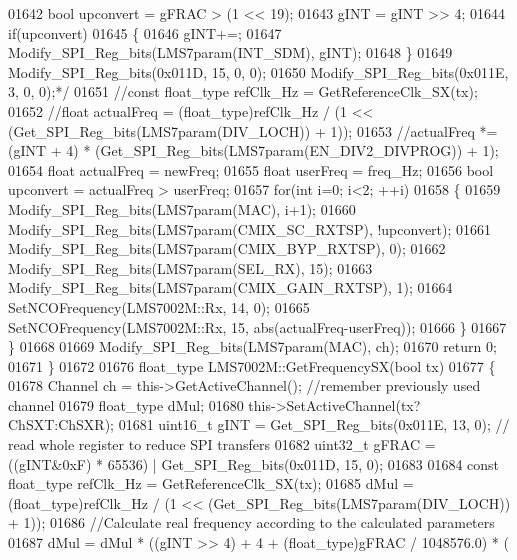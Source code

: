 \begin{DoxyCode}
{{{{{{{{{{{{{{{{{{{{{{{{{{{{{{{{{{{{{{{{{{{{{{{{{01642 \textcolor{comment}{        bool upconvert = gFRAC > (1 << 19);}
01643 \textcolor{comment}{        gINT = gINT >> 4;}
01644 \textcolor{comment}{        if(upconvert)}
01645 \textcolor{comment}{        \{}
01646 \textcolor{comment}{            gINT+=;}
01647 \textcolor{comment}{            Modify\_SPI\_Reg\_bits(LMS7param(INT\_SDM), gINT);}
01648 \textcolor{comment}{        \}}
01649 \textcolor{comment}{        Modify\_SPI\_Reg\_bits(0x011D, 15, 0, 0);}
01650 \textcolor{comment}{        Modify\_SPI\_Reg\_bits(0x011E, 3, 0, 0);*/}
01651         \textcolor{comment}{//const float\_type refClk\_Hz = GetReferenceClk\_SX(tx);}
01652         \textcolor{comment}{//float actualFreq = (float\_type)refClk\_Hz / (1 << (Get\_SPI\_Reg\_bits(LMS7param(DIV\_LOCH)) + 1));}
01653         \textcolor{comment}{//actualFreq *= (gINT + 4) * (Get\_SPI\_Reg\_bits(LMS7param(EN\_DIV2\_DIVPROG)) + 1);}
01654         \textcolor{keywordtype}{float} actualFreq = newFreq;
01655         \textcolor{keywordtype}{float} userFreq = freq\_Hz;
01656         \textcolor{keywordtype}{bool} upconvert = actualFreq > userFreq;
01657         \textcolor{keywordflow}{for}(\textcolor{keywordtype}{int} i=0; i<2; ++i)
01658         \{
01659             Modify_SPI_Reg_bits(LMS7param(MAC), i+1);
01660             Modify_SPI_Reg_bits(LMS7param(CMIX_SC_RXTSP), !upconvert);
01661             Modify_SPI_Reg_bits(LMS7param(CMIX_BYP_RXTSP), 0);
01662             Modify_SPI_Reg_bits(LMS7param(SEL_RX), 15);
01663             Modify_SPI_Reg_bits(LMS7param(CMIX_GAIN_RXTSP), 1);
01664             SetNCOFrequency(LMS7002M::Rx, 14, 0);
01665             SetNCOFrequency(LMS7002M::Rx, 15, abs(actualFreq-userFreq));
01666         \}
01667     \}
01668 
01669     Modify_SPI_Reg_bits(LMS7param(MAC), ch);
01670     \textcolor{keywordflow}{return} 0;
01671 \}
01672 
01676 float_type LMS7002M::GetFrequencySX(\textcolor{keywordtype}{bool} tx)
01677 \{
01678     Channel ch = this->GetActiveChannel(); \textcolor{comment}{//remember previously used channel}
01679     float_type dMul;
01680     this->SetActiveChannel(tx?ChSXT:ChSXR);
01681     uint16\_t gINT = Get_SPI_Reg_bits(0x011E, 13, 0);    \textcolor{comment}{// read whole register to reduce SPI transfers}
01682     uint32\_t gFRAC = ((gINT&0xF) * 65536) | Get_SPI_Reg_bits(0x011D, 15, 0);
01683 
01684     \textcolor{keyword}{const} float_type refClk\_Hz = GetReferenceClk_SX(tx);
01685     dMul = (float_type)refClk\_Hz / (1 << (Get_SPI_Reg_bits(LMS7param(DIV_LOCH)) + 1));
01686     \textcolor{comment}{//Calculate real frequency according to the calculated parameters}
01687     dMul = dMul * ((gINT >> 4) + 4 + (float_type)gFRAC / 1048576.0) * (
}}}}}}}}}}}}}}}}}}}}}}}}}}}}}}}}}}}}}}}}}}}}}}}}}
\end{DoxyCode}
